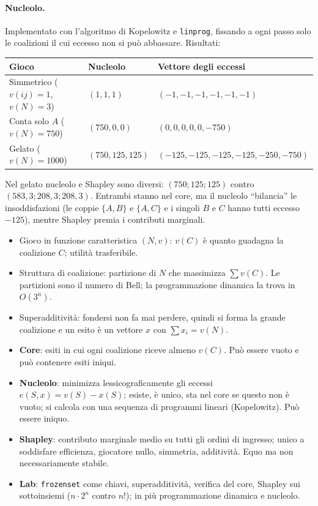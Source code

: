 \paragraph{Nucleolo.}
Implementato con l'algoritmo di Kopelowitz e \texttt{linprog}, fissando a ogni passo solo le
coalizioni il cui eccesso non si può abbassare. Risultati:
\begin{center}
\renewcommand{\arraystretch}{1.2}
\begin{tabular}{lll}
\toprule
Gioco & Nucleolo & Vettore degli eccessi \\
\midrule
Simmetrico ($v(ij) = 1$, $v(N) = 3$) & $(1, 1, 1)$ & $(-1,-1,-1,-1,-1,-1)$ \\
Conta solo $A$ ($v(N) = 750$) & $(750, 0, 0)$ & $(0,0,0,0,0,-750)$ \\
Gelato ($v(N) = 1000$) & $(750, 125, 125)$ & $(-125,-125,-125,-125,-250,-750)$ \\
\bottomrule
\end{tabular}
\end{center}
Nel gelato nucleolo e Shapley sono diversi: $(750; 125; 125)$ contro
$(583{,}3; 208{,}3; 208{,}3)$. Entrambi stanno nel core, ma il nucleolo ``bilancia'' le
insoddisfazioni (le coppie $\{A,B\}$ e $\{A,C\}$ e i singoli $B$ e $C$ hanno tutti eccesso
$-125$), mentre Shapley premia i contributi marginali.

\begin{riepilogo}
\begin{itemize}
  \item Gioco in funzione caratteristica $(N,v)$: $v(C)$ è quanto guadagna la coalizione
        $C$; utilità trasferibile.
  \item Struttura di coalizione: partizione di $N$ che massimizza
        $\sum v(C)$. Le partizioni sono il numero di Bell; la programmazione dinamica la
        trova in $O(3^n)$.
  \item Superadditività: fondersi non fa mai perdere, quindi si forma la grande coalizione e
        un esito è un vettore $x$ con $\sum x_i = v(N)$.
  \item \textbf{Core}: esiti in cui ogni coalizione riceve almeno $v(C)$. Può essere vuoto e
        può contenere esiti iniqui.
  \item \textbf{Nucleolo}: minimizza lessicograficamente gli eccessi
        $e(S,x) = v(S) - x(S)$; esiste, è unico, sta nel core se questo non è vuoto; si
        calcola con una sequenza di programmi lineari (Kopelowitz). Può essere iniquo.
  \item \textbf{Shapley}: contributo marginale medio su tutti gli ordini di ingresso; unico
        a soddisfare efficienza, giocatore nullo, simmetria, additività. Equo ma non
        necessariamente stabile.
  \item \textbf{Lab}: \texttt{frozenset} come chiavi, superadditività, verifica del core,
        Shapley sui sottoinsiemi ($n\cdot2^n$ contro $n!$); in più programmazione dinamica e
        nucleolo.
\end{itemize}
\end{riepilogo}
